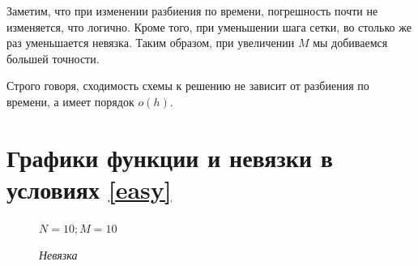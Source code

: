 \documentclass[12pt]{extarticle}
\numberwithin{equation}{section}
\begin{document}
Заметим, что при изменении разбиения по времени, погрешность почти не изменяется, что логично.
Кроме того, при уменьшении шага сетки, во столько же раз уменьшается невязка.
Таким образом, при увеличении $M$ мы добиваемся большей точности. 

Строго говоря, сходимость схемы к решению не зависит от разбиения по времени, а имеет порядок  $o(h)$.



\newpage
\appendix \label{grap1}
\section{Графики функции и невязки в условиях \ref{easy}}
\begin{figure}[H]
\begin{minipage}[h]{0.43\linewidth}
 $N=10; M=10$ \\
\end{minipage}
\hfill
\begin{minipage}[h]{0.43\linewidth}
 \textit{Невязка} \\
\end{minipage}
\end{figure}
\end{document}
